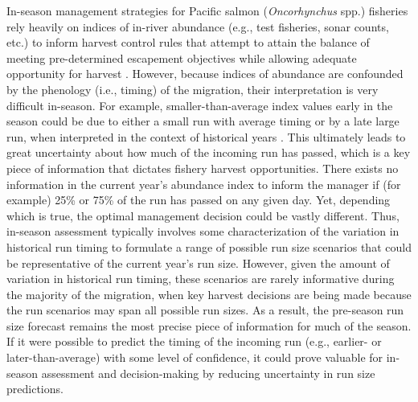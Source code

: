 \documentclass[12pt,]{book}
\theoremstyle{definition}
\theoremstyle{definition}
\theoremstyle{definition}
\theoremstyle{remark}
\begin{document}
In-season management strategies for Pacific salmon (\emph{Oncorhynchus}
spp.) fisheries rely heavily on indices of in-river abundance (e.g.,
test fisheries, sonar counts, etc.) to inform harvest control rules that
attempt to attain the balance of meeting pre-determined escapement
objectives while allowing adequate opportunity for harvest
\citep{catalano-jones-2014}. However, because indices of abundance are
confounded by the phenology (i.e., timing) of the migration, their
interpretation is very difficult in-season. For example,
smaller-than-average index values early in the season could be due to
either a small run with average timing or by a late large run, when
interpreted in the context of historical years
\citep{adkison-cunningham-2015}. This ultimately leads to great
uncertainty about how much of the incoming run has passed, which is a
key piece of information that dictates fishery harvest opportunities.
There exists no information in the current year's abundance index to
inform the manager if (for example) 25\% or 75\% of the run has passed
on any given day. Yet, depending which is true, the optimal management
decision could be vastly different. Thus, in-season assessment typically
involves some characterization of the variation in historical run timing
to formulate a range of possible run size scenarios that could be
representative of the current year's run size. However, given the amount
of variation in historical run timing, these scenarios are rarely
informative during the majority of the migration, when key harvest
decisions are being made because the run scenarios may span all possible
run sizes. As a result, the pre-season run size forecast remains the
most precise piece of information for much of the season. If it were
possible to predict the timing of the incoming run (e.g., earlier- or
later-than-average) with some level of confidence, it could prove
valuable for in-season assessment and decision-making by reducing
uncertainty in run size predictions.
\end{document}
